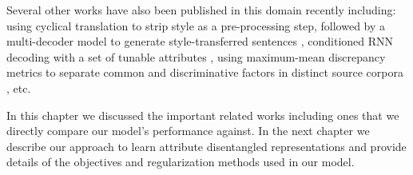 Several other works have also been published in this domain recently including: using cyclical translation to strip style as a pre-processing step, followed by a multi-decoder model to generate style-transferred sentences \citep{prabhumoye2018style}, conditioned RNN decoding with a set of tunable attributes \citep{ficler2017controlling}, using maximum-mean discrepancy metrics to separate common and discriminative factors in distinct source corpora \citep{larsson2017disentangled}, etc.



In this chapter we discussed the important related works including ones that we directly compare our model's performance against. In the next chapter we describe our approach to learn attribute disentangled representations and provide details of the objectives and regularization methods used in our model.

